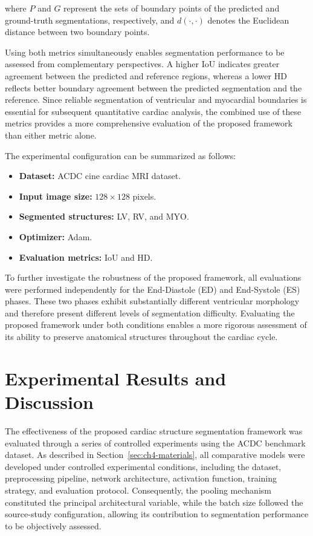 where \(P\) and \(G\) represent the sets of boundary points of the predicted and ground-truth segmentations, respectively, and \(d(\cdot,\cdot)\) denotes the Euclidean distance between two boundary points. 

Using both metrics simultaneously enables segmentation performance to be assessed from complementary perspectives. A higher IoU indicates greater agreement between the predicted and reference regions, whereas a lower HD reflects better boundary agreement between the predicted segmentation and the reference. Since reliable segmentation of ventricular and myocardial boundaries is essential for subsequent quantitative cardiac analysis, the combined use of these metrics provides a more comprehensive evaluation of the proposed framework than either metric alone.

The experimental configuration can be summarized as follows:

\begin{itemize}
	\item \textbf{Dataset:} ACDC cine cardiac MRI dataset.
	\item \textbf{Input image size:} $128 \times 128$ pixels.
	\item \textbf{Segmented structures:} LV, RV, and MYO.
	\item \textbf{Optimizer:} Adam.
	\item \textbf{Evaluation metrics:} IoU and HD.
\end{itemize}

To further investigate the robustness of the proposed framework, all evaluations were performed independently for the End-Diastole (ED) and End-Systole (ES) phases. These two phases exhibit substantially different ventricular morphology and therefore present different levels of segmentation difficulty. Evaluating the proposed framework under both conditions enables a more rigorous assessment of its ability to preserve anatomical structures throughout the cardiac cycle.

\section{Experimental Results and Discussion}
\label{sec:ch4-results}

The effectiveness of the proposed cardiac structure segmentation framework was evaluated through a series of controlled experiments using the ACDC benchmark dataset. As described in Section~\ref{sec:ch4-materials}, all comparative models were developed under controlled experimental conditions, including the dataset, preprocessing pipeline, network architecture, activation function, training strategy, and evaluation protocol. Consequently, the pooling mechanism constituted the principal architectural variable, while the batch size followed the source-study configuration, allowing its contribution to segmentation performance to be objectively assessed.

